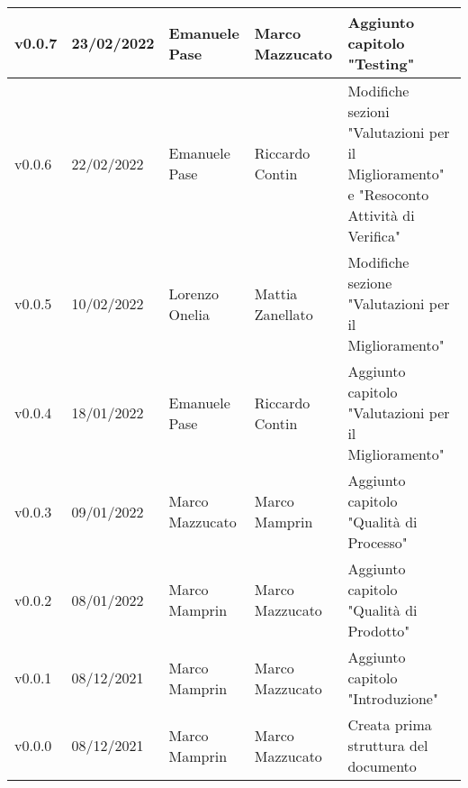 {\begin{longtable}{|C{1.8cm}|C{2.1cm}|C{2cm}|C{2.4cm}|L{4.4cm}|}
  v0.0.7        & 23/02/2022    & Emanuele Pase    & Marco Mazzucato   & Aggiunto capitolo "Testing"                           \\ \hline
  v0.0.6        & 22/02/2022    & Emanuele Pase     & Riccardo Contin    & Modifiche sezioni "Valutazioni per il Miglioramento" e "Resoconto Attività di Verifica" \\ \hline
  v0.0.5        & 10/02/2022    & Lorenzo Onelia    & Mattia Zanellato   & Modifiche sezione "Valutazioni per il Miglioramento"            \\ \hline
  v0.0.4        & 18/01/2022    & Emanuele Pase     & Riccardo Contin    & Aggiunto capitolo "Valutazioni per il Miglioramento"           \\ \hline
  v0.0.3        & 09/01/2022    & Marco Mazzucato   & Marco Mamprin      & Aggiunto capitolo "Qualità di Processo"                        \\ \hline
  v0.0.2        & 08/01/2022    & Marco Mamprin     & Marco Mazzucato    & Aggiunto capitolo "Qualità di Prodotto"                        \\ \hline
  v0.0.1        & 08/12/2021    & Marco Mamprin     & Marco Mazzucato    & Aggiunto capitolo "Introduzione"                               \\ \hline
  v0.0.0        & 08/12/2021    & Marco Mamprin     & Marco Mazzucato    & Creata prima struttura del documento                           \\ \hline
\end{longtable}}

\renewcommand\arraystretch{1}
